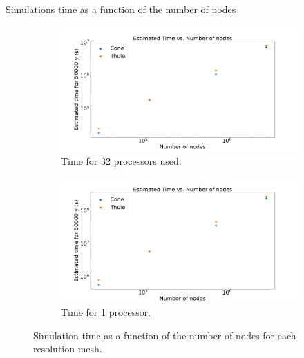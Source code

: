 \documentclass[11pt]{beamer}
\begin{document}
		\begin{frame}{Simulations time as a function of the number of nodes}
			
	
		\begin{figure}
			\centering
			\begin{subfigure}{.5\textwidth}
				\centering
				\includegraphics[width=1.1\linewidth]{../fig/Figure_Time_vs_nodes_Segundos.png}
				\caption{Time for 32 processors used.}
				\label{32_proce}
			\end{subfigure}%
			\begin{subfigure}{.5\textwidth}
				\centering
				\includegraphics[width=1.1\linewidth]{../fig/Figure_Time_vs_nodes_32.png}
				\caption{Time for 1 processor.}
				\label{1_proce}
			\end{subfigure}
			\caption{Simulation time as a function of the number of nodes for each resolution mesh.}
			\label{Computation time}
		\end{figure}
		\end{frame}
\end{document}
